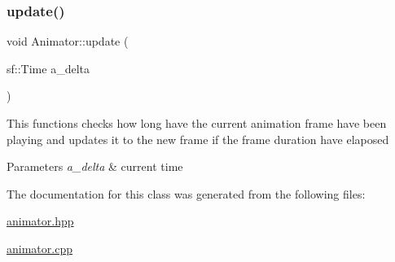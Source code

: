 \subsubsection{\texorpdfstring{update()}{update()}}
{\footnotesize\ttfamily void Animator\+::update (\begin{DoxyParamCaption}\item[{sf\+::\+Time}]{a\+\_\+delta }\end{DoxyParamCaption})}

This functions checks how long have the current animation frame have been playing and updates it to the new frame if the frame duration have elaposed


\begin{DoxyParams}{Parameters}
{\em a\+\_\+delta} & current time \\
\hline
\end{DoxyParams}


The documentation for this class was generated from the following files\+:\begin{DoxyCompactItemize}
\item 
\hyperlink{animator_8hpp}{animator.\+hpp}\item 
\hyperlink{animator_8cpp}{animator.\+cpp}\end{DoxyCompactItemize}
